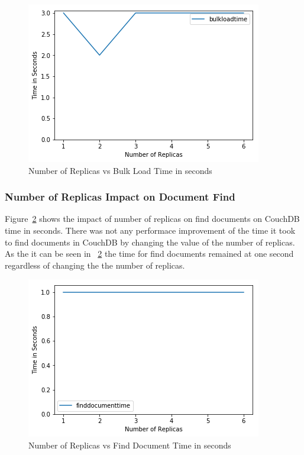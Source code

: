 \begin{figure}[!ht]
  \centering\includegraphics[width=\columnwidth]{../images/ReplicasBulkLoad.png}
  \caption{Number of Replicas vs Bulk Load Time in seconds }\label{f:replica-bulk}
\end{figure}

\subsubsection{Number of Replicas Impact on Document Find}


Figure~\ref{f:replica-find} shows the impact of number of replicas on find
documents on CouchDB time in seconds. There was not any performace
improvement of the time it took to find documents in CouchDB  by
changing the value of the number of replicas. As the it can be seen in
~\ref{f:replica-find} the time for find documents remained at one second
regardless of changing the the number of replicas.

\begin{figure}[!ht]
  \centering\includegraphics[width=\columnwidth]{../images/ReplicasFindDoc.png}
  \caption{Number of Replicas vs Find Document Time in seconds }\label{f:replica-find}
\end{figure}

